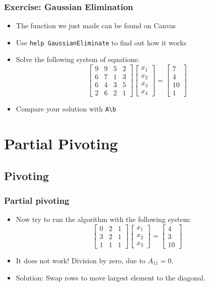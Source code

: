 \documentclass[11pt,table,final,xcolor={usenames,dvipsnames,table}]{beamer}
\begin{document}
\begin{frame}[fragile]
  \frametitle{Exercise: Gaussian Elimination}
  \begin{itemize}
    \item The function we just made can be found on Canvas
    \item Use \lstinline$help GaussianEliminate$ to find out how it works
    \item Solve the following system of equations:
    \[
    \begin{bmatrix}
      9 & 9 & 5 & 2\\ 
      6 & 7 & 1 & 3\\ 
      6 & 4 & 3 & 5\\
      2 & 6 & 2 & 1
    \end{bmatrix}
    \begin{bmatrix}x_1\\x_2\\x_3\\x_4\end{bmatrix} = 
    \begin{bmatrix}7\\4\\10\\1\end{bmatrix}
  \]
  \item Compare your solution with \lstinline$A\b$
  \end{itemize}
\end{frame}

\section{Partial Pivoting}
\subsection*{Pivoting}

\begin{frame}[fragile]
  \frametitle{Partial pivoting}
  \begin{itemize}
    \item Now try to run the algorithm with the following system:
    \[
    \begin{bmatrix}
      0 & 2 & 1\\ 
      3 & 2 & 1 \\ 
      1 & 1 & 1
    \end{bmatrix}
    \begin{bmatrix}x_1\\x_2\\x_3\end{bmatrix} = 
    \begin{bmatrix}4\\3\\10\end{bmatrix}
  \]
  \pause
  \item It does not work! Division by zero, due to $A_{11}=0$.
  \item Solution: Swap rows to move largest element to the diagonal.
  \end{itemize}
\end{frame}
\end{document}
